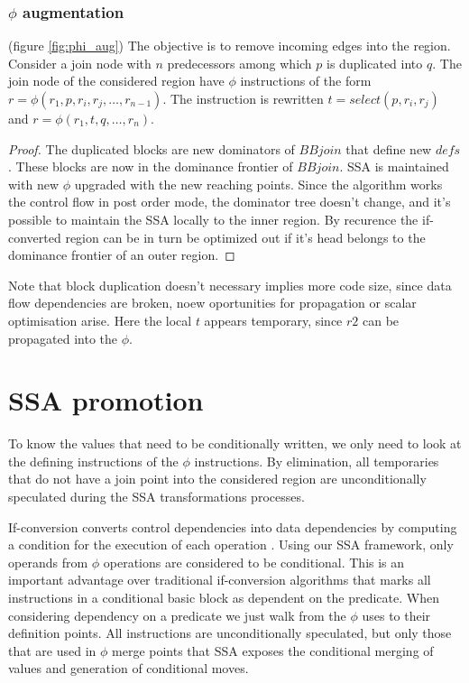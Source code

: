 \subsubsection{$\phi$ augmentation} (figure \ref{fig:phi_aug})
The objective is to remove incoming edges into the region. 
Consider a join node with $n$ predecessors among which $p$ is duplicated into $q$.  The join node of the considered region have $\phi$ instructions of the form $r=\phi(r_1,p,r_i,r_j,\dots,r_{n-1})$. The instruction is rewritten $t=select(p,r_i,r_j)$ and \mbox{$r=\phi(r_1,t,q,\dots,r_n)$}. 
\begin{proof}The duplicated blocks are new dominators of $BBjoin$ that define new $defs$. These blocks are now in the dominance frontier of $BBjoin$. SSA is maintained with new $\phi$ upgraded with the new reaching points.
Since the algorithm works the control flow in post order mode, the dominator tree doesn't change, and it's possible to maintain the SSA locally to the inner region. By recurence the if-converted region can be in turn be optimized out if it's head belongs to the dominance frontier of an outer region.
\end{proof}
Note that block duplication doesn't necessary implies more code size, since data flow dependencies are broken, noew oportunities for propagation or scalar optimisation arise. Here the local $t$ appears temporary, since $r2$ can be propagated into the $\phi$.

\section{SSA promotion}

To know the values that need to be conditionally written, we only need to look at the defining instructions of the $\phi$ instructions. By elimination, all temporaries that do not have a join point into the considered region are unconditionally speculated during the SSA transformations processes.

If-conversion converts control dependencies into data dependencies by computing a condition for the execution of each operation \cite{Schlansker-predicated}. Using our SSA framework, only operands from $\phi$ operations are considered to be conditional. This is an important advantage over traditional if-conversion algorithms that marks all instructions in a conditional basic block as dependent on the predicate. When considering dependency on a predicate we just walk from the $\phi$ uses to their definition points. All instructions are unconditionally speculated, but only those that are used in $\phi$ merge points that SSA exposes the conditional merging of values and generation of conditional moves.

